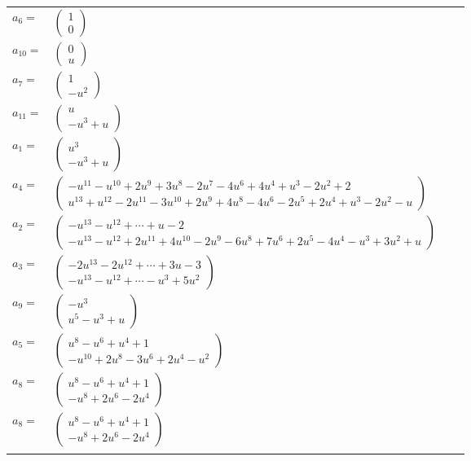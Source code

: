 \documentclass[1p]{elsarticle_modified}
\theoremstyle{definition}
\begin{document}
\begin{tabular}{m{7pt} m{180pt} m{7pt} m{180pt} }
\flushright $a_{6}=$&$\begin{pmatrix}1\\0\end{pmatrix}$ \\
\flushright $a_{10}=$&$\begin{pmatrix}0\\u\end{pmatrix}$ \\
\flushright $a_{7}=$&$\begin{pmatrix}1\\- u^2\end{pmatrix}$ \\
\flushright $a_{11}=$&$\begin{pmatrix}u\\- u^3+u\end{pmatrix}$ \\
\flushright $a_{1}=$&$\begin{pmatrix}u^3\\- u^3+u\end{pmatrix}$ \\
\flushright $a_{4}=$&$\begin{pmatrix}- u^{11}- u^{10}+2 u^9+3 u^8-2 u^7-4 u^6+4 u^4+u^3-2 u^2+2\\u^{13}+u^{12}-2 u^{11}-3 u^{10}+2 u^9+4 u^8-4 u^6-2 u^5+2 u^4+u^3-2 u^2- u\end{pmatrix}$ \\
\flushright $a_{2}=$&$\begin{pmatrix}- u^{13}- u^{12}+\cdots+u-2\\- u^{13}- u^{12}+2 u^{11}+4 u^{10}-2 u^9-6 u^8+7 u^6+2 u^5-4 u^4- u^3+3 u^2+u\end{pmatrix}$ \\
\flushright $a_{3}=$&$\begin{pmatrix}-2 u^{13}-2 u^{12}+\cdots+3 u-3\\- u^{13}- u^{12}+\cdots- u^3+5 u^2\end{pmatrix}$ \\
\flushright $a_{9}=$&$\begin{pmatrix}- u^3\\u^5- u^3+u\end{pmatrix}$ \\
\flushright $a_{5}=$&$\begin{pmatrix}u^8- u^6+u^4+1\\- u^{10}+2 u^8-3 u^6+2 u^4- u^2\end{pmatrix}$ \\
\flushright $a_{8}=$&$\begin{pmatrix}u^8- u^6+u^4+1\\- u^8+2 u^6-2 u^4\end{pmatrix}$\\ \flushright $a_{8}=$&$\begin{pmatrix}u^8- u^6+u^4+1\\- u^8+2 u^6-2 u^4\end{pmatrix}$\\&\end{tabular}
\end{document}
